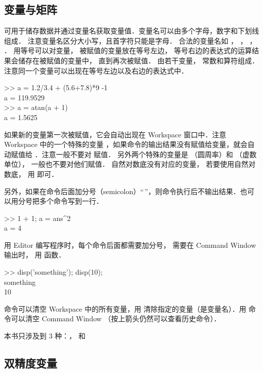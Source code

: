 

\subsection{变量与矩阵}
可用于储存数据并通过变量名获取变量值．变量名可以由多个字母，数字和下划线组成． 注意变量名区分大小写，且首字符只能是字母． 合法的变量名如 ， ， ， ． 用等号可以对变量， 被赋值的变量放在等号左边， 等号右边的表达式的运算结果会储存在被赋值的变量中， 直到再次被赋值． 由若干变量， 常数和算符组成． 注意同一个变量可以出现在等号左边以及右边的表达式中．
\begin{Command}
>> a = 1.2/3.4 + (5.6+7.8)*9 -1 \\
a = 119.9529 \\
>> a = atan(a + 1) \\
a = 1.5625
\end{Command}
如果新的变量第一次被赋值，它会自动出现在 Workspace 窗口中．注意 Workspace 中的一个特殊的变量 ，如果命令的输出结果没有赋值给变量，就会自动赋值给 ．注意一般不要对  赋值． 另外两个特殊的变量是  （圆周率）和  （虚数单位）， 一般也不要对他们赋值． 自然对数底没有对应的变量， 若要使用自然对数底， 用  即可．

另外，如果在命令后面加分号（semicolon）“\,\x{;}”，则命令执行后不输出结果．也可以用分号把多个命令写到一行．
\begin{Command}
>> 1 + 1; a = ans\^{}2 \\
a = 4
\end{Command}
用 Editor 编写程序时，每个命令后面都需要加分号， 需要在 Command Window 输出时， 用  函数．
\begin{Command}
>> disp({\color{string}'something'}); disp(10);\\
something\\
10
\end{Command}

 命令可以清空 Workspace 中的所有变量，用  清除指定的变量（是变量名）．用  命令可以清空 Command Window （按上箭头仍然可以查看历史命令）．

本书只涉及到 3 种：， 和 

\subsection{双精度变量}

